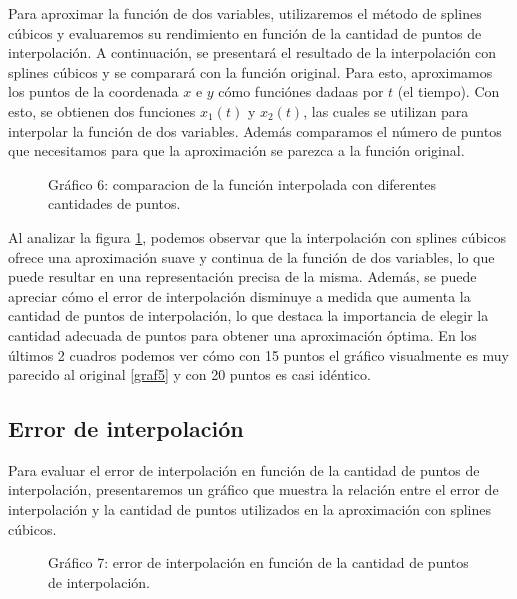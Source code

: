 \documentclass[12pt,a4]{article} %
\begin{document}
\begin{multicols}{2}
Para aproximar la función de dos variables, utilizaremos el método de splines cúbicos y evaluaremos su rendimiento en función de la cantidad de puntos de interpolación. A continuación, se presentará el resultado de la interpolación con splines cúbicos y se comparará con la función original. Para esto, aproximamos los puntos de la coordenada $x$ e $y$ cómo funciónes dadaas por $t$ (el tiempo). Con esto, se obtienen dos funciones $x_1(t)$ y $x_2(t)$, las cuales se utilizan para interpolar la función de dos variables. Además comparamos el número de puntos que necesitamos para que la aproximación se parezca a la función original.

\begin{figure}
    \centering
    \caption{Gráfico 6: comparacion de la función interpolada con diferentes cantidades de puntos.}
    \label{graf6}
\end{figure}

Al analizar la figura \ref{graf6}, podemos observar que la interpolación con splines cúbicos ofrece una aproximación suave y continua de la función de dos variables, lo que puede resultar en una representación precisa de la misma. Además, se puede apreciar cómo el error de interpolación disminuye a medida que aumenta la cantidad de puntos de interpolación, lo que destaca la importancia de elegir la cantidad adecuada de puntos para obtener una aproximación óptima. En los últimos 2 cuadros podemos ver cómo con 15 puntos el gráfico visualmente es muy parecido al original \ref{graf5} y con 20 puntos es casi idéntico.

\subsection{Error de interpolación}

Para evaluar el error de interpolación en función de la cantidad de puntos de interpolación, presentaremos un gráfico que muestra la relación entre el error de interpolación y la cantidad de puntos utilizados en la aproximación con splines cúbicos.

\begin{figure}
    \centering
    \caption{Gráfico 7: error de interpolación en función de la cantidad de puntos de interpolación.}
    \label{graf7}
\end{figure}


\end{multicols}
\end{document}
